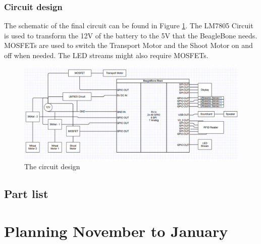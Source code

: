 \documentclass[11pt,twoside,a4paper]{report}
\begin{document}
\subsection{Circuit design}
The schematic of the final circuit can be found in Figure \ref{fig:electronics}. The LM7805 Circuit is used to transform the 12V of the battery to the 5V that the BeagleBone needs. MOSFETs are used to switch the Transport Motor and the Shoot Motor on and off when needed. The LED streams might also require MOSFETs. 
\begin{figure}[H]
\begin{center}
\includegraphics[width = 17cm]{Images/ElectronicalDiagram.png}
\caption{The circuit design}
\label{fig:electronics}
\end{center}
\end{figure}

\section{Part list}

\chapter{Planning November to January}
\end{document}
